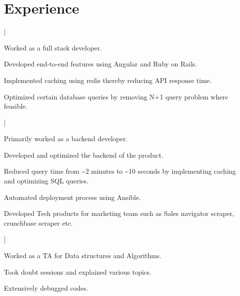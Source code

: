 \documentclass[letterpaper]{main}
\begin{document}
\begin{minipage}[t]{0.66\textwidth} 

\section{Experience}
 |
\begin{tightitemize}
\sectionspace
\item Worked as a full stack developer.
\item Developed end-to-end features using Angular and Ruby on Rails. \\
\item Implemented caching using redis thereby reducing API response time. \\
\item Optimized certain database queries by removing N+1 query problem where feasible.
\end{tightitemize}
\sectionspace 

 |
\begin{tightitemize}
\item Primarily worked as a backend developer.\\
\item Developed and optimized the backend of the product. \\
\item Reduced query time from \textasciitilde2 minutes to \textasciitilde10 seconds by implementing caching and optimizing SQL queries.
\item Automated deployment process using Ansible. \\
\item Developed Tech products for marketing team such as Sales navigator scraper, crunchbase scraper etc. \\
\end{tightitemize}
\sectionspace 

 |
\begin{tightitemize}
\item Worked as a TA for Data structures and Algorithms.
\item Took doubt sessions and explained various topics. \\
\item Extensively debugged codes. \\
\end{tightitemize}
\sectionspace 



\end{minipage}
\end{document}

